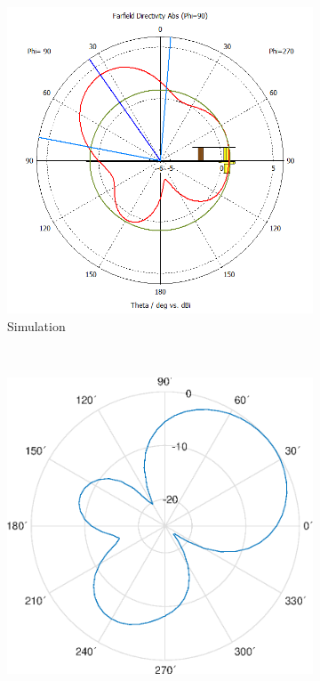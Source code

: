 \documentclass[11pt,a4paper]{article}
\begin{document}
        \begin{figure}[!ht]
            \centering
            \begin{subfigure}{.4\textwidth}
                \centering
                \includegraphics[width=\textwidth]{src/pifa-sim-radiation-e-1G8Hz.png}
                \caption{\label{fig:pifa-sim-radiation-e-1G8Hz}Simulation}
            \end{subfigure}
            ~
            \begin{subfigure}{.4\textwidth}
                \centering
                \includegraphics[width=\textwidth]{src/pifa-meas-radiation-e-1G8Hz.eps}

\end{subfigure}
\end{figure}
\end{document}
